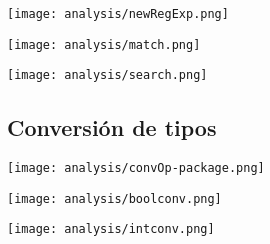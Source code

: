 \begin{multicols}{2}
\begin{center}
\texttt{[image: analysis/newRegExp.png]}
\end{center}
\columnbreak
\begin{center}
\texttt{[image: analysis/match.png]} 
\end{center}
\end{multicols}

\begin{center}
\texttt{[image: analysis/search.png]} 
\end{center}


\subsection {Conversión de tipos}
\begin{center}
\texttt{[image: analysis/convOp-package.png]} 
\end{center}

\begin{multicols}{2}
\begin{center}
\texttt{[image: analysis/boolconv.png]} 
\end{center}
\columnbreak
\begin{center}
\texttt{[image: analysis/intconv.png]} 
\end{center}
\end{multicols}


